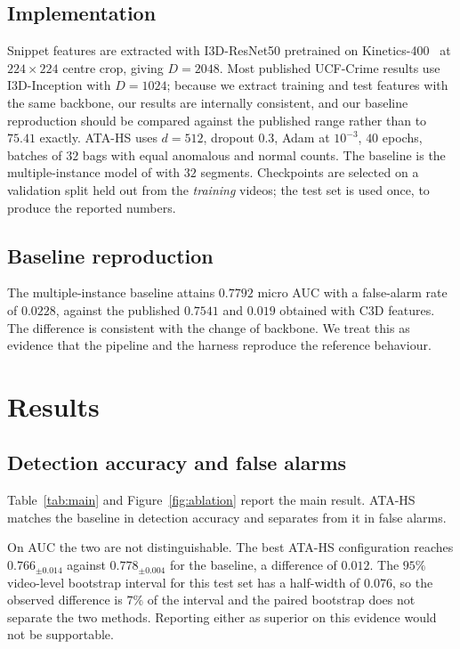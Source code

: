 \documentclass[11pt]{article}
\begin{document}
\subsection{Implementation}
Snippet features are extracted with I3D-ResNet50 pretrained on
Kinetics-400~\citep{carreira2017quo} at $224\times224$ centre crop, giving
$D=2048$. Most published UCF-Crime results use I3D-Inception with $D=1024$;
because we extract training and test features with the same backbone, our
results are internally consistent, and our baseline reproduction should be
compared against the published range rather than to $75.41$ exactly. ATA-HS uses
$d=512$, dropout $0.3$, Adam at $10^{-3}$, $40$ epochs, batches of $32$ bags with
equal anomalous and normal counts. The baseline is the multiple-instance
model of \citet{sultani2018real} with $32$ segments. Checkpoints are selected on a
validation split held out from the \emph{training} videos; the test set is used
once, to produce the reported numbers.

\subsection{Baseline reproduction}
The multiple-instance baseline attains $0.7792$ micro AUC with a false-alarm rate
of $0.0228$, against the published $0.7541$ and $0.019$ obtained with C3D
features. The difference is consistent with the change of backbone. We treat this
as evidence that the pipeline and the harness reproduce the reference behaviour.

\section{Results}
\label{sec:results}

\subsection{Detection accuracy and false alarms}



Table~\ref{tab:main} and Figure~\ref{fig:ablation} report the main result.
ATA-HS matches the baseline in detection accuracy and separates from it in false
alarms.

On AUC the two are not distinguishable. The best ATA-HS configuration
reaches $0.766_{\pm0.014}$ against $0.778_{\pm0.004}$ for the baseline, a
difference of $0.012$. The
$95\%$ video-level bootstrap interval for this test set has a half-width of
$0.076$, so the observed difference is $7\%$ of the interval and the paired
bootstrap does not separate the two methods. Reporting either as superior on this
evidence would not be supportable.
\end{document}
